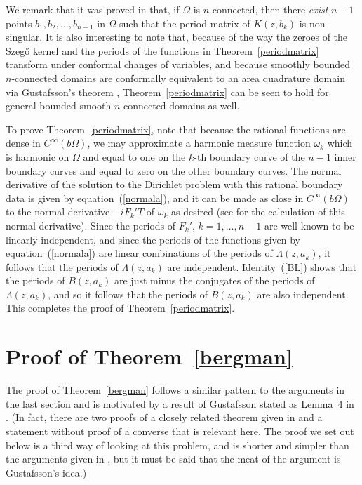 \documentclass[12pt]{amsart}
\newcommand\Om{\Omega}
\numberwithin{equation}{section}
\begin{document}
We remark that it was proved in \cite{B7} that, if $\Om$
is $n$ connected, then there {\it exist\/} $n-1$ points
$b_1,b_2,\dots,b_{n-1}$ in $\Om$ such that the period
matrix of $K(z,b_k)$ is non-singular. It is also interesting
to note that, because of the way the zeroes of the Szeg\H o
kernel and the periods of the functions in
Theorem~\ref{periodmatrix} transform under conformal
changes of variables, and because smoothly bounded
$n$-connected domains are conformally equivalent to an
area quadrature domain via Gustafsson's theorem \cite{G},
Theorem~\ref{periodmatrix} can be seen to hold for
general bounded smooth $n$-connected domains as well.

To prove Theorem~\ref{periodmatrix}, note that because the
rational functions are dense in $C^\infty(b\Om)$, we may
approximate a harmonic measure function $\omega_k$ which is
harmonic on $\Om$ and equal to one on the $k$-th boundary
curve of the $n-1$ inner boundary curves and equal
to zero on the other boundary curves. The normal derivative of
the solution to the Dirichlet problem with this rational
boundary data is given by equation~(\ref{normala}), and it
can be made as close in $C^\infty(b\Om)$ to the normal
derivative $-iF_k'T$ of $\omega_k$ as desired (see
\cite[p.~87]{B1} for the calculation of this normal
derivative). Since the periods of $F_k'$, $k=1,\dots,n-1$
are well known to be linearly independent, and since
the periods of the functions
given by equation~(\ref{normala}) are linear combinations of
the periods of $\Lambda(z,a_k)$, it follows that the periods
of $\Lambda(z,a_k)$ are independent.  Identity~(\ref{BL})
shows that the periods of $B(z,a_k)$ are just minus the
conjugates of the periods of $\Lambda(z,a_k)$, and so it
follows that the periods of $B(z,a_k)$ are also independent.
This completes the proof of Theorem~\ref{periodmatrix}.

\section{Proof of Theorem~\ref{bergman}}
\label{sec5}
The proof of Theorem~\ref{bergman} follows a similar
pattern to the arguments in the last section and is
motivated by a result of Gustafsson stated as Lemma~{4}
in \cite{B4a}. (In fact, there are two proofs of a closely
related theorem given in \cite{B4a} and a statement
without proof of a converse that is relevant here.
The proof we set out below is a third way of looking
at this problem, and is shorter and simpler than the
arguments given in \cite{B4a}, but it must be said that
the meat of the argument is Gustafsson's idea.)
\end{document}
